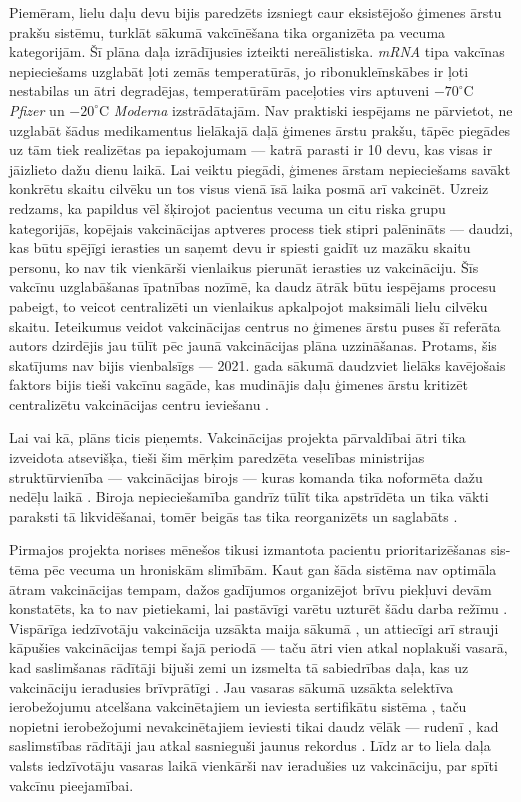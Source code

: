 \documentclass[12pt, a4paper]{article}
\numberwithin{equation}{section} %
\begin{document}
Piemēram, lielu daļu devu bijis paredzēts izsniegt caur eksistējošo ģimenes ārstu prakšu sistēmu, turklāt sākumā vakcīnēšana tika organizēta pa vecuma kategorijām. Šī plāna daļa izrādījusies izteikti nereālistiska. \textit{mRNA} tipa vakcīnas nepieciešams uzglabāt ļoti zemās temperatūrās, jo ribonukleīnskābes ir ļoti nestabilas un ātri degradējas, temperatūrām paceļoties virs aptuveni $-70^\circ$C \textit{Pfizer} un $-20^\circ$C \textit{Moderna} izstrādātajām. Nav praktiski iespējams ne pārvietot, ne uzglabāt šādus medikamentus lielākajā daļā ģimenes ārstu prakšu, tāpēc piegādes uz tām tiek realizētas pa iepakojumam --- katrā parasti ir 10 devu, kas visas ir jāizlieto dažu dienu laikā. Lai veiktu piegādi, ģimenes ārstam nepieciešams savākt konkrētu skaitu cilvēku un tos visus vienā īsā laika posmā arī vakcinēt. Uzreiz redzams, ka papildus vēl šķirojot pacientus vecuma un citu riska grupu kategorijās, kopējais vakcinācijas aptveres process tiek stipri palēnināts --- daudzi, kas būtu spējīgi ierasties un saņemt devu ir spiesti gaidīt uz mazāku skaitu personu, ko nav tik vienkārši vienlaikus pierunāt ierasties uz vakcināciju. Šīs vakcīnu uzglabāšanas īpatnības nozīmē, ka daudz ātrāk būtu iespējams procesu pabeigt, to veicot centralizēti un vienlaikus apkalpojot maksimāli lielu cilvēku skaitu. Ieteikumus veidot vakcinācijas centrus no ģimenes ārstu puses šī referāta autors dzirdējis jau tūlīt pēc jaunā vakcinācijas plāna uzzināšanas. Protams, šis skatījums nav bijis vienbalsīgs --- 2021. gada sākumā daudzviet lielāks kavējošais faktors bijis tieši vakcīnu sagāde, kas mudinājis daļu ģimenes ārstu kritizēt centralizētu vakcinācijas centru ieviešanu \cite{vaxx_center_oppose}.

Lai vai kā, plāns ticis pieņemts. Vakcinācijas projekta pārvaldībai ātri tika izveidota atsevišķa, tieši šim mērķim paredzēta veselības ministrijas struktūrvienība --- vakcinācijas birojs \cite{vaxx_bureau_proposed} --- kuras komanda tika noformēta dažu nedēļu laikā \cite{vaxx_bureau_leadership}. Biroja nepieciešamība gandrīz tūlīt tika apstrīdēta un tika vākti paraksti tā likvidēšanai, tomēr beigās tas tika reorganizēts un saglabāts \cite{vaxx_bureau_reorganized}.

Pirmajos projekta norises mēnešos tikusi izmantota pacientu prioritarizēšanas sis-tēma pēc vecuma un hroniskām slimībām. Kaut gan šāda sistēma nav optimāla ātram vakcinācijas tempam, dažos gadījumos organizējot brīvu piekļuvi devām konstatēts, ka to nav pietiekami, lai pastāvīgi varētu uzturēt šādu darba režīmu \cite{vaxx_queue}. Vispārīga iedzīvotāju vakcinācija uzsākta maija sākumā \cite{vaxx_all}, un attiecīgi arī strauji kāpušies vakcinācijas tempi šajā periodā --- taču ātri vien atkal noplakuši vasarā, kad saslimšanas rādītāji bijuši zemi un izsmelta tā sabiedrības daļa, kas uz vakcināciju ieradusies brīvprātīgi \cite{vaxx_stats}. Jau vasaras sākumā uzsākta selektīva ierobežojumu atcelšana vakcinētajiem un ieviesta sertifikātu sistēma \cite{vaxx_cert}, taču nopietni ierobežojumi nevakcinētajiem ieviesti tikai daudz vēlāk --- rudenī \cite{lv_fire_unvaccinated}, kad saslimstības rādītāji jau atkal sasnieguši jaunus rekordus \cite{lv_stats}. Līdz ar to liela daļa valsts iedzīvotāju vasaras laikā vienkārši nav ieradušies uz vakcināciju, par spīti vakcīnu pieejamībai. 
\end{document}
